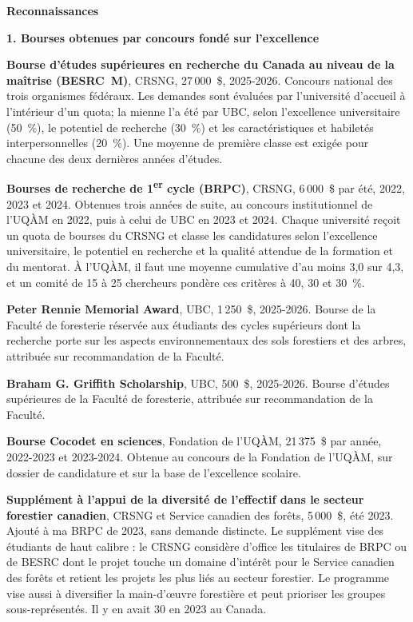 \documentclass[12pt,letterpaper]{article}
\newcommand{\groupe}[1]{\par\vspace{3pt}\textbf{#1}\par\vspace{-0.5pt}}
\begin{document}
\raggedright

\textbf{Reconnaissances}

\groupe{1. Bourses obtenues par concours fondé sur l'excellence}

\textbf{Bourse d'études supérieures en recherche du Canada au niveau de la maîtrise (BESRC~M)}, CRSNG, 27\,000~\$, 2025-2026. Concours national des trois organismes fédéraux. Les demandes sont évaluées par l'université d'accueil à l'intérieur d'un quota; la mienne l'a été par UBC, selon l'excellence universitaire (50~\%), le potentiel de recherche (30~\%) et les caractéristiques et habiletés interpersonnelles (20~\%). Une moyenne de première classe est exigée pour chacune des deux dernières années d'études.

\textbf{Bourses de recherche de 1\textsuperscript{er} cycle (BRPC)}, CRSNG, 6\,000~\$ par été, 2022, 2023 et 2024. Obtenues trois années de suite, au concours institutionnel de l'UQÀM en 2022, puis à celui de UBC en 2023 et 2024. Chaque université reçoit un quota de bourses du CRSNG et classe les candidatures selon l'excellence universitaire, le potentiel en recherche et la qualité attendue de la formation et du mentorat. À l'UQÀM, il faut une moyenne cumulative d'au moins 3,0 sur 4,3, et un comité de 15 à 25 chercheurs pondère ces critères à 40, 30 et 30~\%.

\textbf{Peter Rennie Memorial Award}, UBC, 1\,250~\$, 2025-2026. Bourse de la Faculté de foresterie réservée aux étudiants des cycles supérieurs dont la recherche porte sur les aspects environnementaux des sols forestiers et des arbres, attribuée sur recommandation de la Faculté.

\textbf{Braham G. Griffith Scholarship}, UBC, 500~\$, 2025-2026. Bourse d'études supérieures de la Faculté de foresterie, attribuée sur recommandation de la Faculté.

\textbf{Bourse Cocodet en sciences}, Fondation de l'UQÀM, 21\,375~\$ par année, 2022-2023 et 2023-2024. Obtenue au concours de la Fondation de l'UQÀM, sur dossier de candidature et sur la base de l'excellence scolaire.

\textbf{Supplément à l'appui de la diversité de l'effectif dans le secteur forestier canadien}, CRSNG et Service canadien des forêts, 5\,000~\$, été 2023. Ajouté à ma BRPC de 2023, sans demande distincte. Le supplément vise des étudiants de haut calibre : le CRSNG considère d'office les titulaires de BRPC ou de BESRC dont le projet touche un domaine d'intérêt pour le Service canadien des forêts et retient les projets les plus liés au secteur forestier. Le programme vise aussi à diversifier la main-d'œuvre forestière et peut prioriser les groupes sous-représentés. Il y en avait 30 en 2023 au Canada.
\end{document}
